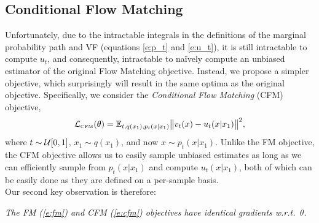 \documentclass{article}
\begin{document}
\subsection{Conditional Flow Matching} Unfortunately, due to the intractable integrals in the definitions of the marginal probability path and VF (equations \ref{e:p_t} and \ref{e:u_t}), it is still intractable to compute $u_t$, and consequently, intractable to na\"ively compute an unbiased estimator of the original Flow Matching objective.
%
Instead, we propose a simpler objective, which surprisingly will result in the same optima as the original objective. 
Specifically, we consider the \emph{Conditional Flow Matching} (CFM) objective,
\begin{equation}\label{e:cfm}
    \mathcal{L}_{\scriptscriptstyle \text{CFM}}(\theta) = \mathbb{E}_{t,q(x_1),p_t(x\vert x_1)} \big\| v_t(x) - u_t(x\vert x_1) \big\|^2,
\end{equation}
where $t\sim {\mathcal{U}}[0,1]$, $x_1\sim q(x_1)$, and now $x\sim p_t(x|x_1)$. 
Unlike the FM objective, the CFM objective allows us to easily sample unbiased estimates as long as we can efficiently sample from $p_t(x|x_1)$ and compute $u_t(x|x_1)$, both of which can be easily done as they are defined on a per-sample basis.\\
Our second key observation is therefore:
\vspace{-0.5em}
\begin{center}			%
    \colorbox{mygray} {		%
      \begin{minipage}{0.977\linewidth} 	%
       \centering
        \emph{The FM (\eqref{e:fm}) and CFM (\eqref{e:cfm}) objectives have identical gradients w.r.t.~$\theta$.}
      \end{minipage}}			%
\end{center}
\end{document}
